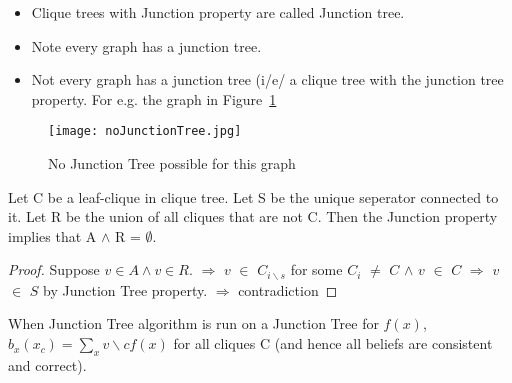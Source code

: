\documentclass[12pt]{report}
\begin{document}
\begin{itemize}
\item Clique trees with Junction property are called Junction tree.
\item Note every graph has a junction tree.
\item Not every graph has a junction tree (i/e/ a clique tree with the junction tree property. For e.g. the graph in Figure~\ref{fig:noJunctionTree}
\end{itemize}



\begin{figure}
\centering
\texttt{[image: noJunctionTree.jpg]}
\caption{No Junction Tree possible for this graph}
\label{fig:noJunctionTree}
\end{figure}

\begin{lemma}
Let C be a leaf-clique in clique tree. Let S be the unique seperator connected to it. Let R be the union of all cliques that are not C. Then the Junction property implies that A $\land$ R = $\emptyset$.
\end{lemma}

\begin{proof}
Suppose $v \in A \land v \in R.$\newline
$\Rightarrow$ $v$ $\in$ $C_{i\backslash s}$ for some $C_{i}$ $\neq$ $C$ $\land$ $v$ $\in$ $C$\newline
$\Rightarrow$ $v$ $\in$ $S$ by Junction Tree property.\newline
$\Rightarrow$ contradiction\newline
\end{proof}

\begin{theorem}
When Junction Tree algorithm is run on a Junction Tree for $f(x)$, $b_{x}(x_{c}) = \sum _x{v \backslash c} f(x)$ for all cliques C (and hence all beliefs are consistent and correct).
\end{theorem}
\end{document}
